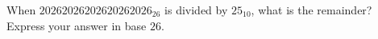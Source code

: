 When $20262026202620262026_{26}$ is divided by $25_{10}$, what is the remainder? Express your answer in base $26$.
